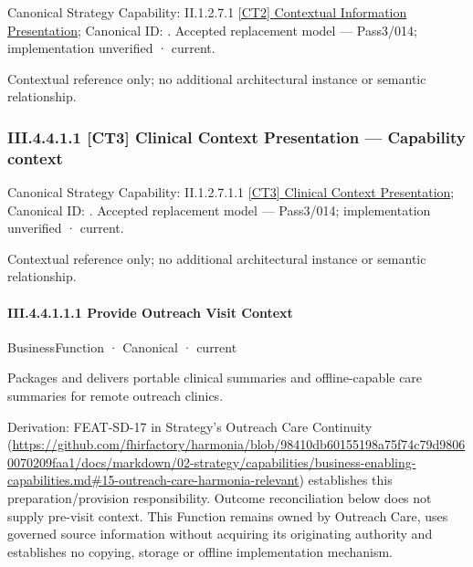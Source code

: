 {\small Canonical Strategy Capability: II.1.2.7.1 \hyperref[element:c24e23b5f3fd454aa861e66dc085267b]{[CT2] Contextual Information Presentation}; Canonical ID: \texttt{}. Accepted replacement model — Pass3/014; implementation unverified · current.}\par
Contextual reference only; no additional architectural instance or semantic relationship.\par
\subsubsection*{III.4.4.1.1 [CT3] Clinical Context Presentation — Capability context}
\label{navigation:III.4.4.1.1}

{\small Canonical Strategy Capability: II.1.2.7.1.1 \hyperref[element:b113ca12a3fd47aea3eb87cbee2dcec9]{[CT3] Clinical Context Presentation}; Canonical ID: \texttt{}. Accepted replacement model — Pass3/014; implementation unverified · current.}\par
Contextual reference only; no additional architectural instance or semantic relationship.\par
\paragraph*{III.4.4.1.1.1 Provide Outreach Visit Context}
\label{navigation:III.4.4.1.1.1}

\label{element:4984d2f87f5a46869400c60cd5c5e0ab}
{\small BusinessFunction · Canonical · current}\par

Packages and delivers portable clinical summaries and offline-capable care summaries for remote outreach clinics.



Derivation: FEAT-SD-17 in Strategy's Outreach Care Continuity (\url{https://github.com/fhirfactory/harmonia/blob/98410db60155198a75f74c79d98060070209faa1/docs/markdown/02-strategy/capabilities/business-enabling-capabilities.md#15-outreach-care-harmonia-relevant}) establishes this preparation/provision responsibility. Outcome reconciliation below does not supply pre-visit context. This Function remains owned by Outreach Care, uses governed source information without acquiring its originating authority and establishes no copying, storage or offline implementation mechanism.


